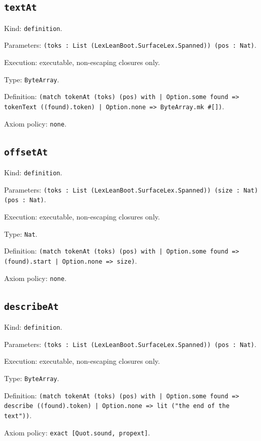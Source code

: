 \documentclass[11pt]{article}
\begin{document}
\subsection*{\texttt{textAt}}
\noindent Kind: \texttt{definition}.\par
\noindent Parameters: \texttt{(toks : List (LexLeanBoot.SurfaceLex.Spanned)) (pos : Nat)}.\par
\noindent Execution: executable, non-escaping closures only.\par
\noindent Type: \texttt{ByteArray}.\par
\noindent Definition: \texttt{(match tokenAt (toks) (pos) with | Option.some found => tokenText ((found).token) | Option.none => ByteArray.mk \#[])}.\par
\noindent Axiom policy: \texttt{none}.\par
\subsection*{\texttt{offsetAt}}
\noindent Kind: \texttt{definition}.\par
\noindent Parameters: \texttt{(toks : List (LexLeanBoot.SurfaceLex.Spanned)) (size : Nat) (pos : Nat)}.\par
\noindent Execution: executable, non-escaping closures only.\par
\noindent Type: \texttt{Nat}.\par
\noindent Definition: \texttt{(match tokenAt (toks) (pos) with | Option.some found => (found).start | Option.none => size)}.\par
\noindent Axiom policy: \texttt{none}.\par
\subsection*{\texttt{describeAt}}
\noindent Kind: \texttt{definition}.\par
\noindent Parameters: \texttt{(toks : List (LexLeanBoot.SurfaceLex.Spanned)) (pos : Nat)}.\par
\noindent Execution: executable, non-escaping closures only.\par
\noindent Type: \texttt{ByteArray}.\par
\noindent Definition: \texttt{(match tokenAt (toks) (pos) with | Option.some found => describe ((found).token) | Option.none => lit ("the end of the text"))}.\par
\noindent Axiom policy: \texttt{exact [Quot.sound, propext]}.\par
\end{document}
